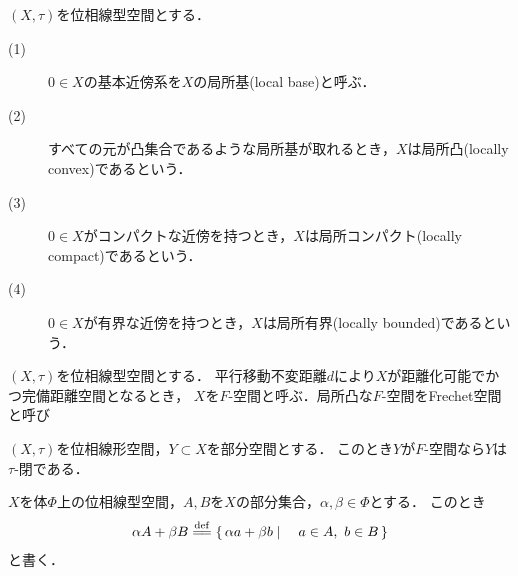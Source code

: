 	\begin{screen}
		\begin{thm}
		\end{thm}
	\end{screen}
	
	\begin{screen}
		\begin{dfn}
			$(X,\tau)$を位相線型空間とする．
			\begin{description}
				\item[(1)] $0 \in X$の基本近傍系を$X$の局所基(local base)と呼ぶ．
				\item[(2)] すべての元が凸集合であるような局所基が取れるとき，$X$は局所凸(locally convex)であるという．
				\item[(3)] $0 \in X$がコンパクトな近傍を持つとき，$X$は局所コンパクト(locally compact)であるという．
				\item[(4)] $0 \in X$が有界な近傍を持つとき，$X$は局所有界(locally bounded)であるという．
			\end{description}
		\end{dfn}
	\end{screen}
	
	\begin{screen}
		\begin{dfn}
			$(X,\tau)$を位相線型空間とする．
			平行移動不変距離$d$により$X$が距離化可能でかつ完備距離空間となるとき，
			$X$を$F$-空間と呼ぶ．局所凸な$F$-空間をFrechet空間と呼び
		\end{dfn}
	\end{screen}
	
	\begin{screen}
		\begin{thm}
			$(X,\tau)$を位相線形空間，$Y \subset X$を部分空間とする．
			このとき$Y$が$F$-空間なら$Y$は$\tau$-閉である．
		\end{thm}
	\end{screen}
	
	\begin{prf}
	\end{prf}
	
	\begin{screen}
		\begin{dfn}[集合の線型演算]
			$X$を体$\Phi$上の位相線型空間，$A,B$を$X$の部分集合，$\alpha,\beta \in \Phi$とする．
			このとき
			\begin{align}
				\alpha A + \beta B \defeq \Set{\alpha a + \beta b}{a \in A,\ b \in B}
			\end{align}
			と書く．
		\end{dfn}
	\end{screen}
	
